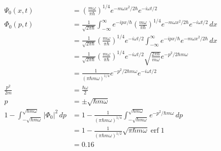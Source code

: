 \documentclass{article}
\DeclareMathOperator{\erf}{erf}
\begin{document}
\setcounter{subsection}{10}
\subsection{}

\begin{align*}
  \Psi_0(x, t)                                                               & = \left( \frac{m \omega}{\pi \hbar} \right)^{1 / 4} e^{-m \omega x^2 / 2 \hbar} e^{-i \omega t / 2}                                                                             \\
  \Phi_0(p, t)                                                               & = \frac{1}{\sqrt{2 \pi \hbar}} \int_{-\infty}^\infty e^{-i p x / \hbar} \left( \frac{m \omega}{\pi \hbar} \right)^{1 / 4} e^{-m \omega x^2 / 2 \hbar} e^{-i \omega t / 2} \,d x \\
                                                                             & = \frac{1}{\sqrt{2 \pi \hbar}} \left( \frac{m \omega}{\pi \hbar} \right)^{1 / 4} e^{-i \omega t / 2} \int_{-\infty}^\infty e^{-i p x / \hbar} e^{-m \omega x^2 / 2 \hbar} \,d x \\
                                                                             & = \frac{1}{\sqrt{2 \pi \hbar}} \left( \frac{m \omega}{\pi \hbar} \right)^{1 / 4} e^{-i \omega t / 2} \sqrt{\frac{2 \pi \hbar}{m \omega}} e^{-p^2 / 2 \hbar m \omega}            \\
                                                                             & = \frac{1}{(\pi \hbar m \omega)^{1 / 4}} e^{-p^2 / 2 \hbar m \omega} e^{-i \omega t / 2}                                                                                        \\
  \frac{p^2}{2 m}                                                            & = \frac{\hbar \omega}{2}                                                                                                                                                        \\
  p                                                                          & = \pm \sqrt{\hbar m \omega}                                                                                                                                                     \\
  1 - \int_{-\sqrt{\hbar m \omega}}^{\sqrt{\hbar m \omega}} |\Phi_0|^2 \,d p & = 1 - \frac{1}{(\pi \hbar m \omega)^{1 / 4}} \int_{-\sqrt{\hbar m \omega}}^{\sqrt{\hbar m \omega}} e^{-p^2 / \hbar m \omega} \,d p                                              \\
                                                                             & = 1 - \frac{1}{(\pi \hbar m \omega)^{1 / 2}} \sqrt{\pi \hbar m \omega} \erf 1                                                                                                   \\
                                                                             & = 0.16
\end{align*}
\end{document}
